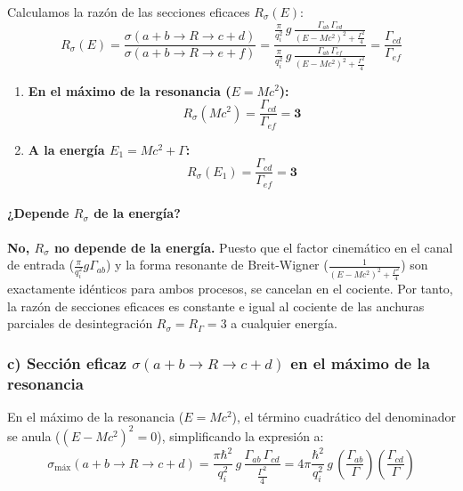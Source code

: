 \begin{problema}
Calculamos la razón de las secciones eficaces $R_\sigma(E)$:
\begin{equation*}
R_\sigma(E) = \frac{\sigma(a+b \to R \to c+d)}{\sigma(a+b \to R \to e+f)} = \frac{\frac{\pi}{q_i^2} \, g \, \frac{\Gamma_{ab} \, \Gamma_{cd}}{(E - M c^2)^2 + \frac{\Gamma^2}{4}}}{\frac{\pi}{q_i^2} \, g \, \frac{\Gamma_{ab} \, \Gamma_{ef}}{(E - M c^2)^2 + \frac{\Gamma^2}{4}}} = \frac{\Gamma_{cd}}{\Gamma_{ef}}
\end{equation*}

\begin{enumerate}[label=(\roman*)]
    \item \textbf{En el máximo de la resonancia ($E = M c^2$):}
    \begin{equation*}
    R_\sigma(M c^2) = \frac{\Gamma_{cd}}{\Gamma_{ef}} = \mathbf{3}
    \end{equation*}
    \item \textbf{A la energía $E_1 = M c^2 + \Gamma$:}
    \begin{equation*}
    R_\sigma(E_1) = \frac{\Gamma_{cd}}{\Gamma_{ef}} = \mathbf{3}
    \end{equation*}
\end{enumerate}

\paragraph{¿Depende $R_\sigma$ de la energía?}
\textbf{No, $R_\sigma$ no depende de la energía.} Puesto que el factor cinemático en el canal de entrada ($\frac{\pi}{q_i^2} g \Gamma_{ab}$) y la forma resonante de Breit-Wigner ($\frac{1}{(E - M c^2)^2 + \frac{\Gamma^2}{4}}$) son exactamente idénticos para ambos procesos, se cancelan en el cociente. Por tanto, la razón de secciones eficaces es constante e igual al cociente de las anchuras parciales de desintegración $R_\sigma = R_\Gamma = 3$ a cualquier energía.

\subsubsection*{c) Sección eficaz $\sigma(a+b \to R \to c+d)$ en el máximo de la resonancia}

En el máximo de la resonancia ($E = M c^2$), el término cuadrático del denominador se anula ($(E - M c^2)^2 = 0$), simplificando la expresión a:
\begin{equation*}
\sigma_{\text{máx}}(a+b \to R \to c+d) = \frac{\pi \hbar^2}{q_i^2} \, g \, \frac{\Gamma_{ab} \, \Gamma_{cd}}{\frac{\Gamma^2}{4}} = 4 \pi \frac{\hbar^2}{q_i^2} \, g \, \left(\frac{\Gamma_{ab}}{\Gamma}\right) \left(\frac{\Gamma_{cd}}{\Gamma}\right)
\end{equation*}


\end{problema}
